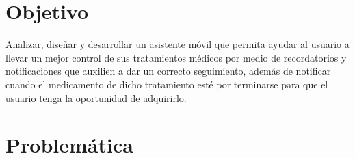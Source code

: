%
%
%

\section{Objetivo}
Analizar, diseñar y desarrollar un asistente móvil que permita ayudar al usuario a llevar un mejor control de sus tratamientos médicos por medio de recordatorios y notificaciones que auxilien a dar un correcto seguimiento, además de notificar cuando el medicamento de dicho tratamiento esté por terminarse para que el usuario tenga la oportunidad de adquirirlo.

\section{Problemática}

